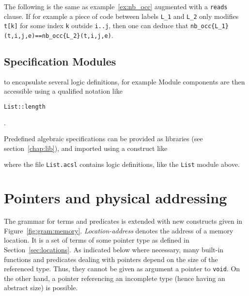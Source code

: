 \begin{example}
  The following is the same as example~\ref{ex:nb_occ} augmented with
  a \lstinline|reads| clause.
  If for example a
  piece of code between labels \lstinline|L_1| and \lstinline|L_2|
  only modifies \lstinline|t[k]| for
  some index \lstinline|k| outside \lstinline|i..j|, then one can deduce that
  \lstinline|nb_occ{L_1}(t,i,j,e)==nb_occ{L_2}(t,i,j,e)|.
\end{example}

\subsection{Specification Modules}
\label{sec:specmodules}

\experimental

 to encapsulate
several logic definitions, for example
Module components are then accessible using a qualified notation like
\begin{notimplementedenv}\lstinline|List::length|\end{notimplementedenv}.

Predefined algebraic specifications can be provided as
libraries (see
section~\ref{chap:lib}), and imported using a construct like
\begin{notimplementedenv}
\end{notimplementedenv}
where the file \lstinline|List.acsl| contains logic
definitions, like the \lstinline|List| module above.



\section{Pointers and physical addressing}
\label{sec:pointers} 
The grammar for terms and predicates is
extended with new constructs given in Figure~\ref{fig:gram:memory}. 
\textsl{Location-address} denotes the address of a memory location. 
It is a set of terms of some pointer type as defined in Section~\ref{sec:locations}. As indicated below where necessary,
many built-in functions and predicates dealing with
pointers depend on the size of the referenced type. Thus, they cannot be given
as argument a pointer to \lstinline|void|. On the
other hand, a pointer referencing an incomplete type (hence having an
abstract size) is possible.

